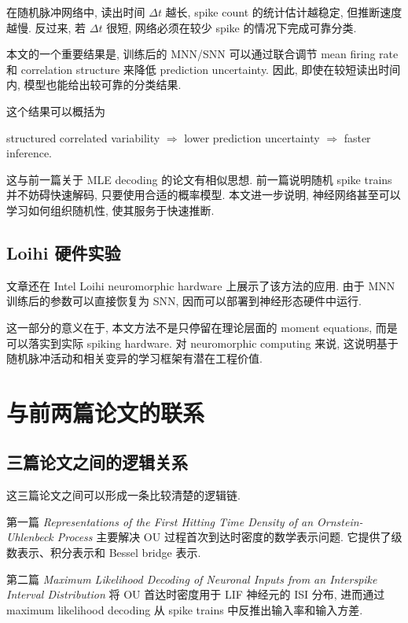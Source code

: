 \documentclass[oneside]{ctexart}
\begin{document}
在随机脉冲网络中, 读出时间 $\Delta t$ 越长, spike count 的统计估计越稳定, 但推断速度越慢. 反过来, 若 $\Delta t$ 很短, 网络必须在较少 spike 的情况下完成可靠分类.

本文的一个重要结果是, 训练后的 MNN/SNN 可以通过联合调节 mean firing rate 和 correlation structure 来降低 prediction uncertainty. 因此, 即使在较短读出时间内, 模型也能给出较可靠的分类结果.

这个结果可以概括为

\begin{center}
    structured correlated variability $\Longrightarrow$ lower prediction uncertainty $\Longrightarrow$ faster inference.
\end{center}

这与前一篇关于 MLE decoding 的论文有相似思想. 前一篇说明随机 spike trains 并不妨碍快速解码, 只要使用合适的概率模型. 本文进一步说明, 神经网络甚至可以学习如何组织随机性, 使其服务于快速推断.

\subsection{Loihi 硬件实验}

文章还在 Intel Loihi neuromorphic hardware 上展示了该方法的应用. 由于 MNN 训练后的参数可以直接恢复为 SNN, 因而可以部署到神经形态硬件中运行.

这一部分的意义在于, 本文方法不是只停留在理论层面的 moment equations, 而是可以落实到实际 spiking hardware. 对 neuromorphic computing 来说, 这说明基于随机脉冲活动和相关变异的学习框架有潜在工程价值.

\section{与前两篇论文的联系}

\subsection{三篇论文之间的逻辑关系}

这三篇论文之间可以形成一条比较清楚的逻辑链.

第一篇 \textit{Representations of the First Hitting Time Density of an Ornstein-Uhlenbeck Process} 主要解决 OU 过程首次到达时密度的数学表示问题. 它提供了级数表示、积分表示和 Bessel bridge 表示.

第二篇 \textit{Maximum Likelihood Decoding of Neuronal Inputs from an Interspike Interval Distribution} 将 OU 首达时密度用于 LIF 神经元的 ISI 分布, 进而通过 maximum likelihood decoding 从 spike trains 中反推出输入率和输入方差.
\end{document}
